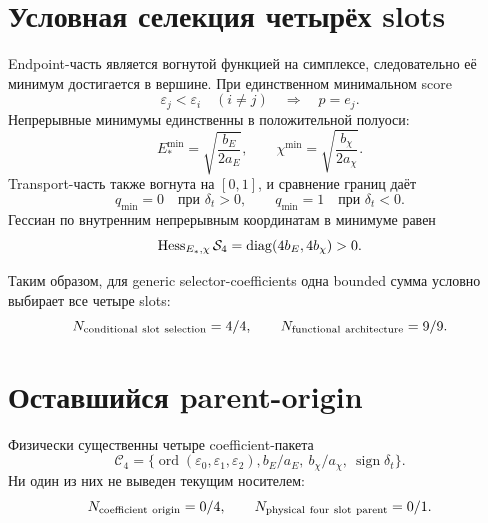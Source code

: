 \section{Условная селекция четырёх slots}

Endpoint-часть является вогнутой функцией на симплексе, следовательно её
минимум достигается в вершине. При единственном минимальном score
\begin{equation}
 \varepsilon_j<\varepsilon_i\quad(i\ne j)
 \quad\Longrightarrow\quad p=e_j.
 \label{eq:v9-functional-endpoint-selection}
\end{equation}
Непрерывные минимумы единственны в положительной полуоси:
\begin{equation}
 E_*^{\min}=\sqrt{\frac{b_E}{2a_E}},
 \qquad
 \chi^{\min}=\sqrt{\frac{b_\chi}{2a_\chi}}.
 \label{eq:v9-functional-continuous-minima}
\end{equation}
Transport-часть также вогнута на $[0,1]$, и сравнение границ даёт
\begin{equation}
 q_{\min}=0\quad\text{при }\delta_t>0,
 \qquad
 q_{\min}=1\quad\text{при }\delta_t<0.
 \label{eq:v9-functional-transport-selection}
\end{equation}
Гессиан по внутренним непрерывным координатам в минимуме равен
\begin{equation}
 \operatorname{Hess}_{E_*,\chi}\mathcal S_4
 =\operatorname{diag}(4b_E,4b_\chi)>0.
 \label{eq:v9-functional-continuous-hessian}
\end{equation}

Таким образом, для generic selector-coefficients одна bounded сумма
условно выбирает все четыре slots:
\begin{equation}
 N_{\rm conditional\ slot\ selection}=4/4,
 \qquad N_{\rm functional\ architecture}=9/9.
 \label{eq:v9-functional-architecture-ledger}
\end{equation}

\section{Оставшийся parent-origin}

Физически существенны четыре coefficient-пакета
\begin{equation}
 \mathcal C_4=
 \{\operatorname{ord}(\varepsilon_0,\varepsilon_1,\varepsilon_2),
 b_E/a_E,\ b_\chi/a_\chi,\ \operatorname{sign}\delta_t\}.
 \label{eq:v9-functional-coefficient-packages}
\end{equation}
Ни один из них не выведен текущим носителем:
\begin{equation}
 N_{\rm coefficient\ origin}=0/4,
 \qquad N_{\rm physical\ four\ slot\ parent}=0/1.
 \label{eq:v9-functional-origin-ledger}
\end{equation}

